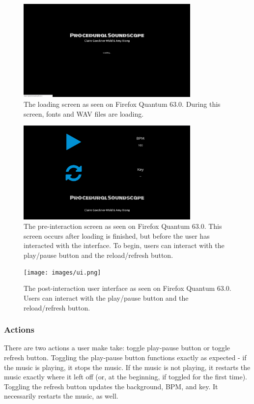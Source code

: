 \documentclass[12pt,a4paper]{article}
\begin{document}
\begin{figure}
\centering\includegraphics[width=0.8\textwidth]{images/loading.png}
\caption{The loading screen as seen on Firefox Quantum 63.0. During this screen, fonts and WAV files are loading.}
\end{figure}

\begin{figure}
\centering\includegraphics[width=0.8\textwidth]{images/loaded.png}
\caption{The pre-interaction screen as seen on Firefox Quantum 63.0. This screen occurs after loading is finished, but before the user has interacted with the interface. To begin, users can interact with the play/pause button and the reload/refresh button.}
\end{figure}

\begin{figure}
\centering\texttt{[image: images/ui.png]}
\caption{The post-interaction user interface as seen on Firefox Quantum 63.0. Users can interact with the play/pause button and the reload/refresh button.}
\end{figure}

\subsubsection{Actions}

There are two actions a user make take: toggle play-pause button or toggle refresh button. Toggling the play-pause button functions exactly as expected - if the music is playing, it stops the music. If the music is not playing, it restarts the music exactly where it left off (or, at the beginning, if toggled for the first time). Toggling the refresh button updates the background, BPM, and key. It necessarily restarts the music, as well.
\end{document}
